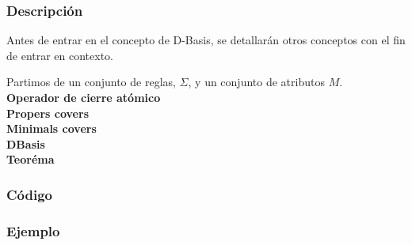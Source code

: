 \subsubsection{Descripci\'on} 
Antes de entrar en el concepto de D-Basis, se detallar\'an otros conceptos con el fin de entrar en contexto.

Partimos de un conjunto de reglas, \( \Sigma \), y un conjunto de atributos \( M \).\\

\textbf{Operador de cierre at\'omico}\\

\textbf{Propers covers} \\

\textbf{Minimals covers}\\

\textbf{DBasis}\\

\textbf{Teor\'ema}\\


\newpage 
\subsubsection{C\'odigo} 

\newpage
\subsubsection{Ejemplo} 